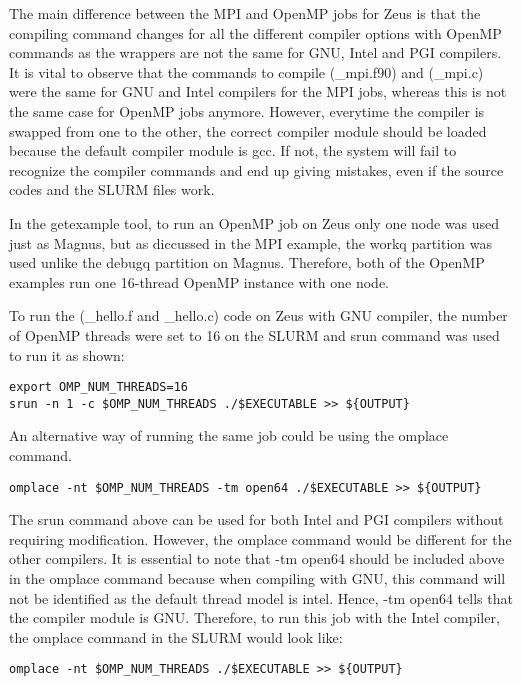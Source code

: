 \documentclass[journal]{IEEEtran}
\begin{document}
{The main difference between the MPI and OpenMP jobs for Zeus is that the compiling command changes for all the different compiler options with OpenMP
commands as the wrappers are not the same for GNU, Intel and PGI compilers. It is vital to observe that the commands to compile (\hello\_mpi.f90) and
(\hello\_mpi.c) were the same for GNU and Intel compilers for the MPI jobs, whereas this is not the same case for OpenMP jobs anymore. However, everytime the
compiler is swapped from one to the other, the correct compiler module should be loaded because the default compiler module is gcc. If not, the system 
will fail to recognize the compiler commands and end up giving mistakes, even if the source codes and the SLURM files work.

In the getexample tool, to run an OpenMP job on Zeus only one node was used just as Magnus, but as diccussed in the MPI example, the workq partition was
used unlike the debugq partition on Magnus. Therefore, both of the OpenMP examples run one 16-thread OpenMP instance with one node.

To run the (\omp\_hello.f and \omp\_hello.c) code on Zeus with GNU compiler, the number of OpenMP threads were set to 16 on the SLURM and srun command was 
used to run it as shown:

\begin{verbatim}
export OMP_NUM_THREADS=16
srun -n 1 -c $OMP_NUM_THREADS ./$EXECUTABLE >> ${OUTPUT}
\end{verbatim}

An alternative way of running the same job could be using the omplace command.

\begin{verbatim}
omplace -nt $OMP_NUM_THREADS -tm open64 ./$EXECUTABLE >> ${OUTPUT}
\end{verbatim}

The srun command above can be used for both Intel and PGI compilers without requiring modification. However, the omplace command would be different for
the other compilers. It is essential to note that -tm open64 should be included above in the omplace command because when compiling with GNU, this 
command will not be identified as the default thread model is intel. Hence, -tm open64 tells that the compiler module is GNU. Therefore, to run this job
with the Intel compiler, the omplace command in the SLURM would look like:

\begin{verbatim}
omplace -nt $OMP_NUM_THREADS ./$EXECUTABLE >> ${OUTPUT}


\end{verbatim}}
\end{document}
